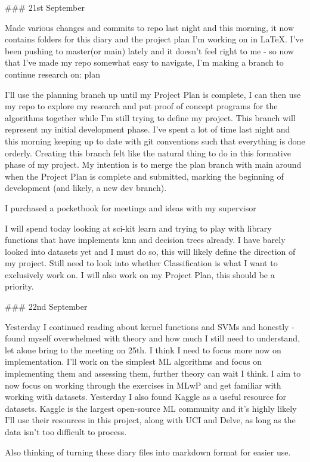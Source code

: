 \documentclass[letterpaper,10pt]{article}
\begin{document}
\begin{markdown}
### 21st September

Made various changes and commits to repo last night and this morning, it now contains folders for this diary and the project plan I'm working on in LaTeX. I've been pushing to master(or main) lately and it doesn't feel right to me - so now that I've made my repo somewhat easy to navigate, I'm making a branch to continue research on: plan

I'll use the planning branch up until my Project Plan is complete, I can then use my repo to explore my research and put proof of concept programs for the algorithms together while I'm still trying to define my project. This branch will represent my initial development phase. I've spent a lot of time last night and this morning keeping up to date with git conventions such that everything is done orderly. Creating this branch felt like the natural thing to do in this formative phase of my project. My intention is to merge the plan branch with main around when the Project Plan is complete and submitted, marking the beginning of development (and likely, a new dev branch).

I purchased a pocketbook for meetings and ideas with my supervisor

I will spend today looking at sci-kit learn and trying to play with library functions that have implements knn and decision trees already. I have barely looked into datasets yet and I must do so, this will likely define the direction of my project. Still need to look into whether Classification is what I want to exclusively work on. I will also work on my Project Plan, this should be a priority.

### 22nd September

Yesterday I continued reading about kernel functions and SVMs and honestly - found myself overwhelmed with theory and how much I still need to understand, let alone bring to the meeting on 25th. I think I need to focus more now on implementation. I'll work on the simplest ML algorithms and focus on implementing them and assessing them, further theory can wait I think.
I aim to now focus on working through the exercises in MLwP and get familiar with working with datasets.
Yesterday I also found Kaggle as a useful resource for datasets. Kaggle is the largest open-source ML community and it's highly likely I'll use their resources in this project, along with UCI and Delve, as long as the data isn't too difficult to process.

Also thinking of turning these diary files into markdown format for easier use.


\end{markdown}
\end{document}
